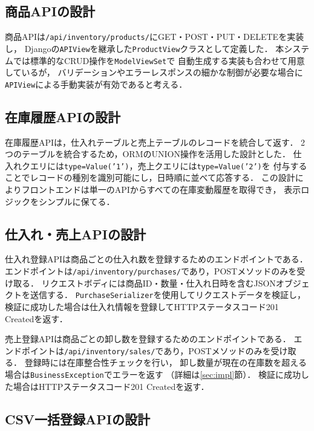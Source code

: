 \documentclass[submit,techrep]{ipsj}
\begin{document}
\subsection{商品APIの設計}

商品APIは\texttt{/api/inventory/products/}にGET・POST・PUT・DELETEを実装し，
Djangoの\texttt{APIView}を継承した\texttt{ProductView}クラスとして定義した．
本システムでは標準的なCRUD操作を\texttt{ModelViewSet}\cite{drf-docs}で
自動生成する実装も合わせて用意しているが，
バリデーションやエラーレスポンスの細かな制御が必要な場合に
\texttt{APIView}による手動実装が有効であると考える．

\subsection{在庫履歴APIの設計}
\label{sec:union}

在庫履歴APIは，仕入れテーブルと売上テーブルのレコードを統合して返す．
2つのテーブルを統合するため，ORMのUNION操作を活用した設計とした．
仕入れクエリには\texttt{type=Value('1')}，売上クエリには\texttt{type=Value('2')}を
付与することでレコードの種別を識別可能にし，日時順に並べて応答する．
この設計によりフロントエンドは単一のAPIからすべての在庫変動履歴を取得でき，
表示ロジックをシンプルに保てる．

\subsection{仕入れ・売上APIの設計}

仕入れ登録APIは商品ごとの仕入れ数を登録するためのエンドポイントである．
エンドポイントは\texttt{/api/inventory/purchases/}であり，POSTメソッドのみを受け取る．
リクエストボディには商品ID・数量・仕入れ日時を含むJSONオブジェクトを送信する．
\texttt{PurchaseSerializer}を使用してリクエストデータを検証し，
検証に成功した場合は仕入れ情報を登録してHTTPステータスコード201 Createdを返す．

売上登録APIは商品ごとの卸し数を登録するためのエンドポイントである．
エンドポイントは\texttt{/api/inventory/sales/}であり，POSTメソッドのみを受け取る．
登録時には在庫整合性チェックを行い，
卸し数量が現在の在庫数を超える場合は\texttt{BusinessException}でエラーを返す
（詳細は\ref{sec:impl}節）．
検証に成功した場合はHTTPステータスコード201 Createdを返す．

\subsection{CSV一括登録APIの設計}
\end{document}
